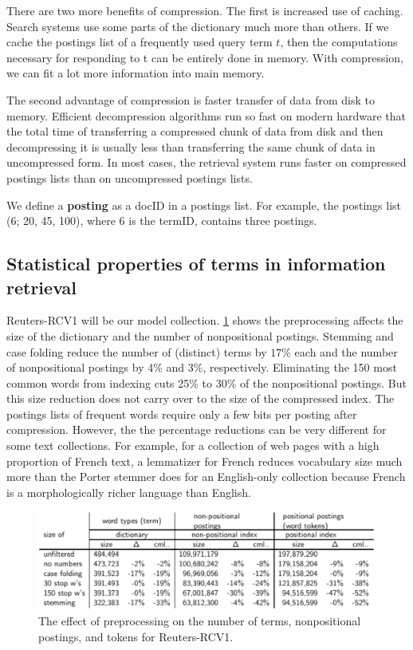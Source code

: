 \documentclass[letterpaper,11pt]{article}
\begin{document}
There are two more benefits of compression. The first is increased use of caching. Search systems use some parts of the dictionary much more than others. If we cache the postings list of a frequently used query term $t$, then the computations necessary for responding to t can be entirely done in memory. With compression, we can fit a lot more information into main memory.

The second advantage of compression is faster transfer of data from disk to memory. Efficient decompression algorithms run so fast on modern hardware that the total time of transferring a compressed chunk of data from disk and then decompressing it is usually less than transferring the same chunk of data in uncompressed form. In most cases, the retrieval system runs faster on compressed postings lists than on uncompressed postings lists.

We define a \textbf{posting} as a docID in a postings list. For example, the postings list (6; 20, 45, 100), where 6 is the termID, contains three postings.

\subsection{Statistical properties of terms in information retrieval}

Reuters-RCV1 will be our model collection. \ref{RCV1-table} shows the preprocessing affects the size of the dictionary and the number of nonpositional postings. Stemming and case folding reduce the number of (distinct) terms by $17\%$ each and the number of nonpositional postings by 4\% and 3\%, respectively. Eliminating the 150 most common words from indexing cuts 25\% to 30\% of the nonpositional postings. But this size reduction does not carry over to the size of the compressed index. The postings lists of frequent words require only a few bits per posting after compression. However, the the percentage reductions can be very different for some text collections. For example, for a collection of web pages with a high proportion of French text, a lemmatizer for French reduces vocabulary size much more than the Porter stemmer does for an English-only collection because French is a morphologically richer language than English.

\begin{figure}[H]
    \centering
    \includegraphics[scale=0.40]{sect5/table_5_1.png}
    \caption{The effect of preprocessing on the number of terms, nonpositional postings, and tokens for Reuters-RCV1.}
    \label{RCV1-table}
\end{figure}
\end{document}
